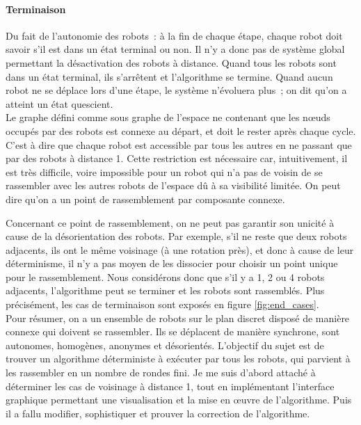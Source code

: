 \paragraph{Terminaison} Du fait de l'autonomie des robots~: à la fin de chaque
étape, chaque robot doit savoir s'il est dans un état terminal ou non. Il n'y a
donc pas de système global permettant la désactivation des robots à distance.
Quand tous les robots sont dans un état terminal, ils s'arrêtent et
l'algorithme se termine. Quand aucun robot ne se déplace lors d'une étape, le
système n'évoluera plus~; on dit qu'on a atteint un état quescient. \\

Le graphe défini comme sous graphe de l'espace ne contenant que les n\oe{}uds
occupés par des robots est connexe au départ, et doit le rester après chaque
cycle. C'est à dire que chaque robot est accessible par tous les autres en ne
passant que par des robots à distance 1. Cette restriction est nécessaire car,
intuitivement, il est très difficile, voire impossible pour un robot qui n'a
pas de voisin de se rassembler avec les autres robots de l'espace dû à sa
visibilité limitée. On peut dire qu'on a un point de rassemblement par
composante connexe.

Concernant ce point de rassemblement, on ne peut pas garantir son unicité à
cause de la désorientation des robots. Par exemple, s'il ne reste que deux
robots adjacents, ils ont le même voisinage (à une rotation près), et donc à
cause de leur déterminisme, il n'y a pas moyen de les dissocier pour choisir un
point unique pour le rassemblement. Nous considérons donc que s'il y a 1, 2 ou
4 robots adjacents, l'algorithme peut se terminer et les robots sont
rassemblés. Plus précisément, les cas de terminaison sont exposés en figure
\ref{fig:end_cases}. \\ 

Pour résumer, on a un ensemble de robots sur le plan discret disposé de manière
connexe qui doivent se rassembler. Ils se déplacent de manière synchrone, sont
autonomes, homogènes, anonymes et désorientés. L'objectif du sujet est de
trouver un algorithme déterministe à exécuter par tous les robots, qui parvient
à les rassembler en un nombre de rondes fini. Je me suis d'abord attaché à
déterminer les cas de voisinage à distance 1, tout en implémentant l'interface
graphique permettant une visualisation et la mise en \oe{}uvre de l'algorithme.
Puis il a fallu modifier, sophistiquer et prouver la correction de
l'algorithme.

